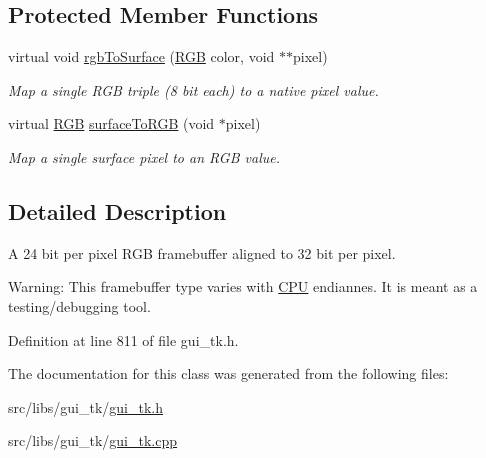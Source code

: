 \subsection*{Protected Member Functions}
\begin{DoxyCompactItemize}
\item 
\hypertarget{classGUI_1_1ScreenRGB32le_ab7657b6a960ab081be4c9adecdaa0750}{virtual void \hyperlink{classGUI_1_1ScreenRGB32le_ab7657b6a960ab081be4c9adecdaa0750}{rgb\-To\-Surface} (\hyperlink{namespaceGUI_aeafd135255365f3584da0e982fc79466}{R\-G\-B} color, void $\ast$$\ast$pixel)}\label{classGUI_1_1ScreenRGB32le_ab7657b6a960ab081be4c9adecdaa0750}

\begin{DoxyCompactList}\small\item\em Map a single R\-G\-B triple (8 bit each) to a native pixel value. \end{DoxyCompactList}\item 
\hypertarget{classGUI_1_1ScreenRGB32le_ad6fbb227845ecca03bf04d344a40dce9}{virtual \hyperlink{namespaceGUI_aeafd135255365f3584da0e982fc79466}{R\-G\-B} \hyperlink{classGUI_1_1ScreenRGB32le_ad6fbb227845ecca03bf04d344a40dce9}{surface\-To\-R\-G\-B} (void $\ast$pixel)}\label{classGUI_1_1ScreenRGB32le_ad6fbb227845ecca03bf04d344a40dce9}

\begin{DoxyCompactList}\small\item\em Map a single surface pixel to an R\-G\-B value. \end{DoxyCompactList}\end{DoxyCompactItemize}


\subsection{Detailed Description}
A 24 bit per pixel R\-G\-B framebuffer aligned to 32 bit per pixel. 

Warning\-: This framebuffer type varies with \hyperlink{classCPU}{C\-P\-U} endiannes. It is meant as a testing/debugging tool. 

Definition at line 811 of file gui\-\_\-tk.\-h.



The documentation for this class was generated from the following files\-:\begin{DoxyCompactItemize}
\item 
src/libs/gui\-\_\-tk/\hyperlink{gui__tk_8h}{gui\-\_\-tk.\-h}\item 
src/libs/gui\-\_\-tk/\hyperlink{gui__tk_8cpp}{gui\-\_\-tk.\-cpp}\end{DoxyCompactItemize}
